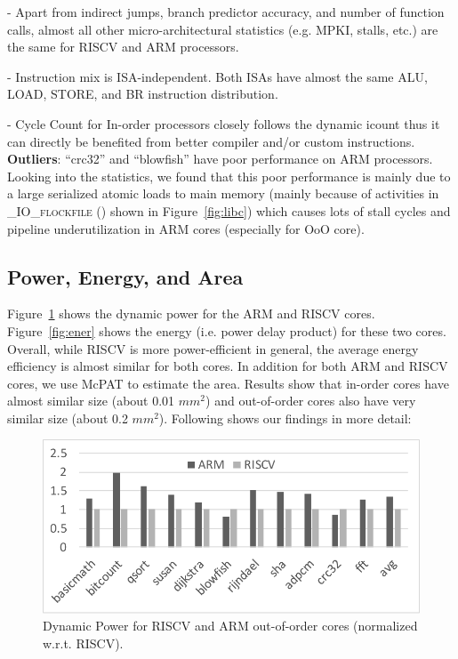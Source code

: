 - Apart from indirect jumps, branch predictor accuracy, and number of function calls, almost all other micro-architectural statistics (e.g. MPKI, stalls, etc.) are the same for RISCV and ARM processors.

- Instruction mix is ISA-independent. Both ISAs have almost the same ALU, LOAD, STORE, and BR instruction distribution. 

- Cycle Count for In-order processors closely follows the dynamic icount thus it can directly be benefited from better compiler and/or custom instructions. \\

\noindent \textbf{Outliers}: ``crc32'' and ``blowfish'' have poor performance on ARM processors. Looking into the statistics, we found that this poor performance is mainly due to a large serialized atomic loads to main memory (mainly because of activities in \textsc{\_IO\_flockfile ()} shown in Figure~\ref{fig:libc}) which causes lots of stall cycles and pipeline underutilization in ARM cores (especially for OoO core). 

\subsection{Power, Energy, and Area}
Figure~\ref{fig:pow} shows the dynamic power for the ARM and RISCV cores. Figure~\ref{fig:ener} shows the energy (i.e. power delay product) for these two cores. Overall, while RISCV is more power-efficient in general, the average energy efficiency is almost similar for both cores. In addition for both ARM and RISCV cores, we use McPAT to estimate the area. Results show that in-order cores have almost similar size (about 0.01 $mm^2$) and out-of-order cores also have very similar size (about 0.2 $mm^2$). Following shows our findings in more detail:  

\begin{figure}[]
	\centering
	\includegraphics[width=1\columnwidth]{figures/power.pdf}
	\caption{Dynamic Power for RISCV and ARM out-of-order cores (normalized w.r.t. RISCV).}
	\label{fig:pow}
	\vspace{-1em}
\end{figure} 

